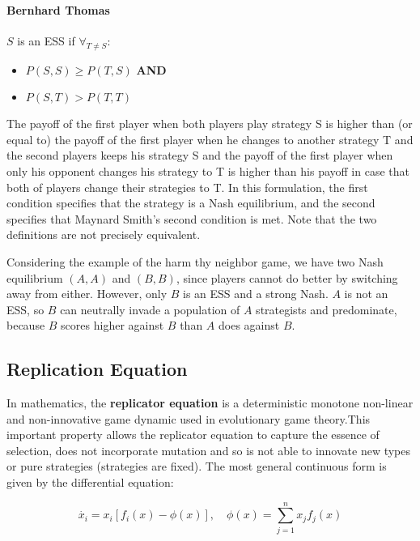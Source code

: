 \paragraph{Bernhard Thomas} $S$ is an ESS if $\forall_{T\neq S}$:
\begin{itemize}
	\item $P(S,S) \geq P(T,S)$ \textbf{AND}
	\item $P(S,T) > P(T,T)$
\end{itemize}
The payoff of the first player when both players play strategy S is higher than (or equal to) the payoff of the first player when he changes to another strategy T and the second players keeps his strategy S and the payoff of the first player when only his opponent changes his strategy to T is higher than his payoff in case that both of players change their strategies to T.
In this formulation, the first condition specifies that the strategy is a Nash equilibrium, and the second specifies that Maynard Smith's second condition is met. Note that the two definitions are not precisely equivalent. \\


Considering the example of the harm thy neighbor game, we have two Nash equilibrium $(A, A)$ and $(B, B)$, since players cannot do better by switching away from either.  However, only $B$ is an ESS and a strong Nash. $A$ is not an ESS, so $B$ can neutrally invade a population of $A$ strategists and predominate, because $B$ scores higher against $B$ than $A$ does against $B$.

\subsection{Replication Equation}
In mathematics, the \textbf{replicator equation} is a deterministic monotone non-linear and non-innovative game dynamic used in evolutionary game theory.This important property allows the replicator equation to capture the essence of selection, does not incorporate mutation and so is not able to innovate new types or pure strategies (strategies are fixed).
The most general continuous form is given by the differential equation:

$$ \dot{x_i} = x_i [ f_i(x) - \phi(x)], \quad \phi(x) = \sum_{j=1}^{n}{x_j f_j(x)}$$


